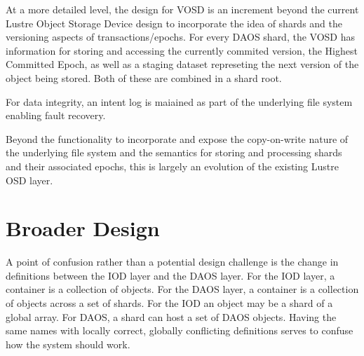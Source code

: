 \documentclass[conference]{IEEEtran}
\begin{document}
At a more detailed level, the design for VOSD is an increment beyond the
current Lustre Object Storage Device design to incorporate the idea of shards
and the versioning aspects of transactions/epochs. For every DAOS shard, the
VOSD has information for storing and accessing the currently commited version,
the Highest Committed Epoch, as well as a staging dataset represeting the
next version of the object being stored. Both of these are combined in a shard
root.

For data integrity, an intent log is maiained as part of the underlying file
system enabling fault recovery.

Beyond the functionality to incorporate and expose the copy-on-write nature
of the underlying file system and the semantics for storing and processing
shards and their associated epochs, this is largely an evolution of the
existing Lustre OSD layer.

\section{Broader Design}
\label{sec:broader}

%
%
A point of confusion rather than a potential design challenge is the change in
definitions between the IOD layer and the DAOS layer.  For the IOD layer, a
container is a collection of objects. For the DAOS layer, a container is a
collection of objects across a set of shards. For the IOD an object may be a
shard of a global array.  For DAOS, a shard can host a set of DAOS objects.
Having the same names with locally correct, globally conflicting definitions
serves to confuse how the system should work.
\end{document}
